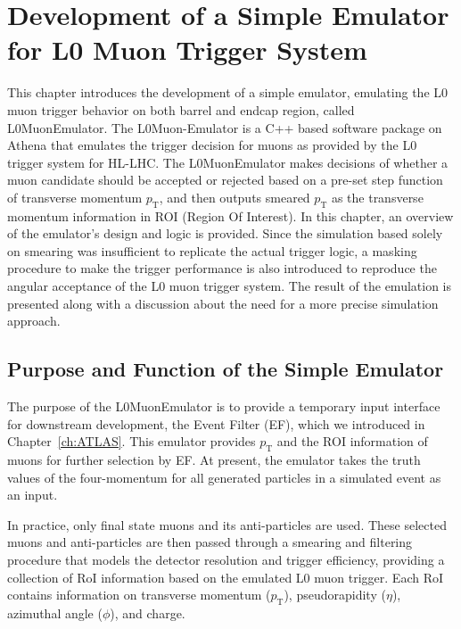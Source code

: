 \chapter{Development of a Simple Emulator for L0 Muon Trigger System} \label{ch:L0MuonEmulator}
This chapter introduces the development of a simple emulator, emulating the L0 muon trigger behavior on both barrel and endcap region, called L0MuonEmulator. The L0Muon-Emulator is a C++ based software package on Athena that emulates the trigger decision for muons as provided by the L0 trigger system for HL-LHC. The L0MuonEmulator makes decisions of whether a muon candidate should be accepted or rejected based on a pre-set step function of transverse momentum $p_\mathrm{T}$, and then outputs smeared $p_\mathrm{T}$ as the transverse momentum information in ROI (Region Of Interest). In this chapter, an overview of the emulator's design and logic is provided. Since the simulation based solely on smearing was insufficient to replicate the actual trigger logic, a masking procedure to make the trigger performance is also introduced to reproduce the angular acceptance of the L0 muon trigger system. The result of the emulation is presented along with a discussion about the need for a more precise simulation approach.
\section{Purpose and Function of the Simple Emulator} \label{sec:L0MuonPurpose}
The purpose of the L0MuonEmulator is to provide a temporary input interface for downstream development, the Event Filter (EF), which we introduced in Chapter~\ref{ch:ATLAS}. This emulator provides $p_\mathrm{T}$ and the ROI information of muons for further selection by EF. At present, the emulator takes the truth values of the four-momentum for all generated particles in a simulated event as an input. 

In practice, only final state muons and its anti-particles are used. These selected muons and anti-particles are then passed through a smearing and filtering procedure that models the detector resolution and trigger efficiency, providing a collection of RoI information based on the emulated L0 muon trigger. Each RoI contains information on transverse momentum ($p_\mathrm{T}$), pseudorapidity ($\eta$), azimuthal angle ($\phi$), and charge.

